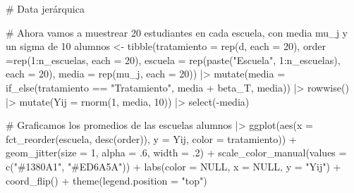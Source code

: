 \documentclass[
  letterpaper,
  DIV=11,
  numbers=noendperiod,
  oneside]{scrreprt}
\newenvironment{Shaded}{\begin{snugshade}}{\end{snugshade}}
\newcommand{\AttributeTok}[1]{\textcolor[rgb]{0.40,0.45,0.13}{#1}}
\newcommand{\CommentTok}[1]{\textcolor[rgb]{0.37,0.37,0.37}{#1}}
\newcommand{\ConstantTok}[1]{\textcolor[rgb]{0.56,0.35,0.01}{#1}}
\newcommand{\DecValTok}[1]{\textcolor[rgb]{0.68,0.00,0.00}{#1}}
\newcommand{\FunctionTok}[1]{\textcolor[rgb]{0.28,0.35,0.67}{#1}}
\newcommand{\NormalTok}[1]{\textcolor[rgb]{0.00,0.23,0.31}{#1}}
\newcommand{\OtherTok}[1]{\textcolor[rgb]{0.00,0.23,0.31}{#1}}
\newcommand{\SpecialCharTok}[1]{\textcolor[rgb]{0.37,0.37,0.37}{#1}}
\newcommand{\StringTok}[1]{\textcolor[rgb]{0.13,0.47,0.30}{#1}}
\begin{document}
\begin{Shaded}
\begin{Highlighting}[]
\CommentTok{\# Data jerárquica}

\CommentTok{\# Ahora vamos a muestrear 20 estudiantes en cada escuela, con media mu\_j y un sigma de 10}
\NormalTok{alumnos }\OtherTok{\textless{}{-}} \FunctionTok{tibble}\NormalTok{(}\AttributeTok{tratamiento =} \FunctionTok{rep}\NormalTok{(d, }\AttributeTok{each =} \DecValTok{20}\NormalTok{), }
                  \AttributeTok{order =}\FunctionTok{rep}\NormalTok{(}\DecValTok{1}\SpecialCharTok{:}\NormalTok{n\_escuelas, }\AttributeTok{each =} \DecValTok{20}\NormalTok{),}
                  \AttributeTok{escuela =} \FunctionTok{rep}\NormalTok{(}\FunctionTok{paste}\NormalTok{(}\StringTok{"Escuela"}\NormalTok{, }\DecValTok{1}\SpecialCharTok{:}\NormalTok{n\_escuelas), }\AttributeTok{each =} \DecValTok{20}\NormalTok{),}
                  \AttributeTok{media =} \FunctionTok{rep}\NormalTok{(mu\_j, }\AttributeTok{each =} \DecValTok{20}\NormalTok{)) }\SpecialCharTok{|\textgreater{}}
  \FunctionTok{mutate}\NormalTok{(}\AttributeTok{media =} \FunctionTok{if\_else}\NormalTok{(tratamiento }\SpecialCharTok{==} \StringTok{"Tratamiento"}\NormalTok{, media }\SpecialCharTok{+}\NormalTok{ beta\_T, media)) }\SpecialCharTok{|\textgreater{}}
  \FunctionTok{rowwise}\NormalTok{() }\SpecialCharTok{|\textgreater{}}
  \FunctionTok{mutate}\NormalTok{(}\AttributeTok{Yij =} \FunctionTok{rnorm}\NormalTok{(}\DecValTok{1}\NormalTok{, media, }\DecValTok{10}\NormalTok{)) }\SpecialCharTok{|\textgreater{}}
  \FunctionTok{select}\NormalTok{(}\SpecialCharTok{{-}}\NormalTok{media)}

\CommentTok{\# Graficamos los promedios de las escuelas}
\NormalTok{alumnos }\SpecialCharTok{|\textgreater{}}
  \FunctionTok{ggplot}\NormalTok{(}\FunctionTok{aes}\NormalTok{(}\AttributeTok{x =}  \FunctionTok{fct\_reorder}\NormalTok{(escuela, }\FunctionTok{desc}\NormalTok{(order)), }
             \AttributeTok{y =}\NormalTok{ Yij,}
             \AttributeTok{color =}\NormalTok{ tratamiento)) }\SpecialCharTok{+}
  \FunctionTok{geom\_jitter}\NormalTok{(}\AttributeTok{size =} \DecValTok{1}\NormalTok{, }
              \AttributeTok{alpha =}\NormalTok{ .}\DecValTok{6}\NormalTok{,}
              \AttributeTok{width =}\NormalTok{ .}\DecValTok{2}\NormalTok{) }\SpecialCharTok{+}
  \FunctionTok{scale\_color\_manual}\NormalTok{(}\AttributeTok{values =} \FunctionTok{c}\NormalTok{(}\StringTok{"\#1380A1"}\NormalTok{, }\StringTok{"\#ED6A5A"}\NormalTok{)) }\SpecialCharTok{+}
  \FunctionTok{labs}\NormalTok{(}\AttributeTok{color =} \ConstantTok{NULL}\NormalTok{, }\AttributeTok{x =} \ConstantTok{NULL}\NormalTok{, }\AttributeTok{y =} \StringTok{"Yij"}\NormalTok{) }\SpecialCharTok{+}
  \FunctionTok{coord\_flip}\NormalTok{() }\SpecialCharTok{+}
  \FunctionTok{theme}\NormalTok{(}\AttributeTok{legend.position =} \StringTok{"top"}\NormalTok{)}
\end{Highlighting}
\end{Shaded}
\end{document}

